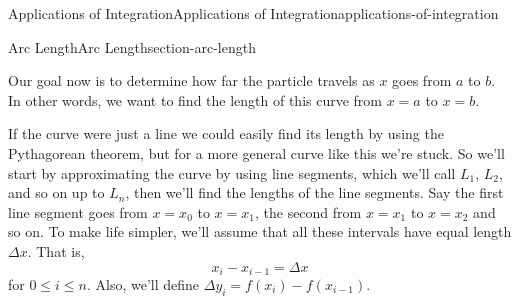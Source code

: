 \documentclass[oneside,10pt,]{book}
\numberwithin{equation}{section}
\begin{document}
\begin{chapterptx}{Applications of Integration}{}{Applications of Integration}{}{}{applications-of-integration}
\begin{sectionptx}{Arc Length}{}{Arc Length}{}{}{section-arc-length}
\begin{figure}
{
}
\end{figure}
%
\par
\hypertarget{p-650}{}%
Our goal now is to determine how far the particle travels as \(x\) goes from \(a\) to \(b\). In other words, we want to find the length of this curve from \(x=a\) to \(x=b\).%
\par
\hypertarget{p-651}{}%
If the curve were just a line we could easily find its length by using the Pythagorean theorem, but for a more general curve like this we're stuck. So we'll start by approximating the curve by using line segments, which we'll call \(L_1\), \(L_2\), and so on up to \(L_{n}\), then we'll find the lengths of the line segments. Say the first line segment goes from \(x=x_0\) to \(x=x_1\), the second from \(x=x_1\) to \(x=x_2\) and so on. To make life simpler, we'll assume that all these intervals have equal length \(\Delta x\). That is,%
\begin{equation*}
x_{i} - x_{i-1}  = \Delta x
\end{equation*}
for \(0 \leq i\leq n\). Also, we'll define \(\Delta y_{i} = f(x_{i}) - f(x_{i-1})\).%
\begin{figure}
\centering
{
}
\end{figure}
\end{sectionptx}
\end{chapterptx}
\end{document}

